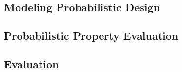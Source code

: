 \subsection{Modeling Probabilistic Design}

\subsection{Probabilistic Property Evaluation}

\subsection{Evaluation}
